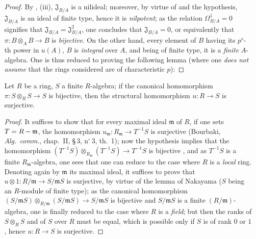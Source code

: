\begin{proof}
By , (iii), $\mathfrak{J}_{B/A}$ is a nilideal; moreover, by virtue of  and the hypothesis, $\mathfrak{J}_{B/A}$ is an ideal of finite type, hence it is \emph{nilpotent}; as the relation $\Omega^1_{B/A}=0$ signifies that $\mathfrak{J}_{B/A}=\mathfrak{J}^2_{B/A}$, one concludes that $\mathfrak{J}_{B/A}=0$, or equivalently that $\pi:B\otimes_A B\to B$ is \emph{bijective}.
On the other hand, every element of $B$ having its $p^s$-th power in $u(A)$, $B$ is \emph{integral} over $A$, and being of finite type, it is a \emph{finite} $A$-algebra.
One is thus reduced to proving the following lemma (where one \emph{does not assume} that the rings considered are of characteristic $p$):
\end{proof}

\begin{lemma}[21.1.6.1]
\label{0.21.1.6.1}
Let $R$ be a ring, $S$ a finite $R$-algebra; if the canonical homomorphism $\pi:S\otimes_R S\to S$ is bijective, then the structural homomorphism $u:R\to S$ is surjective.
\end{lemma}

\begin{proof}
It suffices to show that for every maximal ideal $\mathfrak{m}$ of $R$, if one sets $T=R-\mathfrak{m}$, the homomorphism $u_\mathfrak{m}:R_\mathfrak{m}\to T^{-1}S$ is surjective (Bourbaki, \emph{Alg.\ comm.}, chap.~II, \S\,3, n$^\circ$\,3, th.~1); now the hypothesis implies that the homomorphism $(T^{-1}S)\otimes_{R_\mathfrak{m}}(T^{-1}S)\to T^{-1}S$ is bijective , and as $T^{-1}S$ is a finite $R_\mathfrak{m}$-algebra, one sees that one can reduce to the case where $R$ is a \emph{local} ring.
Denoting again by $\mathfrak{m}$ its maximal ideal, it suffices to prove that $u\otimes 1:R/\mathfrak{m}\to S/\mathfrak{m}S$ is surjective, by virtue of the lemma of Nakayama ($S$ being an $R$-module of finite type); as the canonical homomorphism $(S/\mathfrak{m}S)\otimes_{R/\mathfrak{m}}(S/\mathfrak{m}S)\to S/\mathfrak{m}S$ is bijective and $S/\mathfrak{m}S$ is a finite $(R/\mathfrak{m})$-algebra, one is finally reduced to the case where $R$ is a \emph{field}; but then the ranks of $S\otimes_R S$ and of $S$ over $R$ must be equal, which is possible only if $S$ is of rank $0$ or $1$, hence $u:R\to S$ is surjective.
\end{proof}

